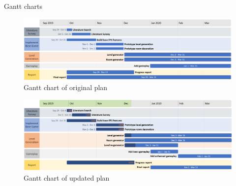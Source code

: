 \documentclass[progress]{cmpreport}
\begin{document}
\begin{section}{Gantt charts}

\begin{figure}[H]
    \includegraphics[width=\textwidth,height=0.9\textheight,keepaspectratio]{img/gantt-original.png}
    \caption{Gantt chart of original plan}
    \label{fig:gantt1}
\end{figure}

\begin{figure}[H]
    \includegraphics[width=\textwidth,height=0.9\textheight,keepaspectratio]{img/gantt-updated.png}
    \caption{Gantt chart of updated plan}
    \label{fig:gantt2}
\end{figure}

\end{section}
\end{document}

